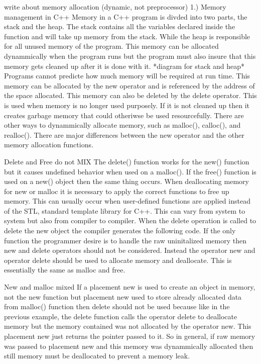 \documentclass[letterpaper, 12pt]{article}
\begin{document}
write about memory allocation (dynamic, not preprocessor)
1.) Memory management in C++
	Memory in a C++ program is divded into two parts, the stack and the heap. The stack contains all the variables
	declared inside the function and will take up memory from the stack. While the heap is responsible for all unused memory
	of the program. This memory can be allocated dynammically when the program runs but the program must also insure that this
	memory gets cleaned up after it is done with it.
	*diagram for stack and heap*
	Programs cannot predicte how much memory will be required at run time. This memory can be allocated by the new operator 			and is referenced by the address of the space allocated. This memory can also be deleted by the delete operator. This is used 			when memory is no longer used purposely. If it is not cleaned up then it creates garbage memory that could otheriwse be used 		resourcefully. There are other ways to dynammically allocate memory, such as malloc(), calloc(), and realloc(). There are major 		differences between the new operator and the other memory allocation functions.

	Delete and Free do not MIX
	The delete() function works for the new() function but it causes undefined behavior when used on a malloc(). If the free() function is used on a new() object then the same thing occurs. When deallocating memory for new or malloc it is necessary to apply the correct functions to free up memory. This can usually occur when user-defined functions are applied instead of the STL, standard template library for C++. This can vary from system to system but also from compiler to compiler. When the delete operation is called to delete the new object the compiler generates the following code.
	If the only function the programmer desire is to handle the raw uninitalized memory then new and delete operators should not be considered. Instead the operator new and operator delete should be used to allocate memory and deallocate. This is essentially the same as malloc and free.

	New and malloc mixed
	If a placement new is used to create an object in memory, not the new function but placement new used to store already allocated data from malloc() function then delete should not be used because like in the previous example, the delete function calls the operator delete to deallocate memory but the memory contained was not allocated by the operator new. This placement new just returns the pointer passed to it. So in general, if raw memory was passed to placement new and this memory was dynammically allocated then still memory must be deallocated to prevent a memory leak.
\end{document}
